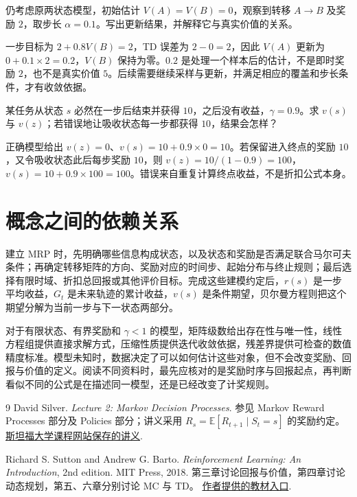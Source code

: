 \documentclass[UTF8,12pt,a4paper,fontset=fandol]{ctexart}
\begin{document}
\begin{example}[一次 TD 更新是否等于求出了价值]
仍考虑原两状态模型，初始估计 $V(A)=V(B)=0$，观察到转移 $A\to B$ 及奖励 $2$，取步长 $\alpha=0.1$。写出更新结果，并解释它与真实价值的关系。
\end{example}
\begin{solve}
一步目标为 $2+0.8V(B)=2$，TD 误差为 $2-0=2$，因此 $V(A)$ 更新为 $0+0.1\times2=0.2$，$V(B)$ 保持为零。$0.2$ 是处理一个样本后的估计，不是即时奖励 $2$，也不是真实价值 $5$。后续需要继续采样与更新，并满足相应的覆盖和步长条件，才有收敛依据。
\end{solve}

\begin{example}[终止奖励与吸收状态奖励的区别]
某任务从状态 $s$ 必然在一步后结束并获得 $10$，之后没有收益，$\gamma=0.9$。求 $v(s)$ 与 $v(z)$；若错误地让吸收状态每一步都获得 $10$，结果会怎样？
\end{example}
\begin{solve}
正确模型给出 $v(z)=0$、$v(s)=10+0.9\times0=10$。若保留进入终点的奖励 $10$，又令吸收状态此后每步奖励 $10$，则 $v(z)=10/(1-0.9)=100$，$v(s)=10+0.9\times100=100$。错误来自重复计算终点收益，不是折扣公式本身。
\end{solve}

\section{概念之间的依赖关系}
\label{sec:mrp-connections}

建立 MRP 时，先明确哪些信息构成状态，以及状态和奖励是否满足联合马尔可夫条件；再确定转移矩阵的方向、奖励对应的时间步、起始分布与终止规则；最后选择有限时域、折扣总回报或其他评价目标。完成这些建模约定后，$r(s)$ 是一步平均收益，$G_t$ 是未来轨迹的累计收益，$v(s)$ 是条件期望，贝尔曼方程则把这个期望分解为当前一步与下一状态两部分。

对于有限状态、有界奖励和 $\gamma<1$ 的模型，矩阵级数给出存在性与唯一性，线性方程组提供直接求解方式，压缩性质提供迭代收敛依据，残差界提供可检查的数值精度标准。模型未知时，数据决定了可以如何估计这些对象，但不会改变奖励、回报与价值的定义。阅读不同资料时，最先应核对的是奖励时序与回报起点，再判断看似不同的公式是在描述同一模型，还是已经改变了计奖规则。

\begin{thebibliography}{9}
  David Silver.
  \textit{Lecture 2: Markov Decision Processes}.
  参见 Markov Reward Processes 部分及 Policies 部分；讲义采用
  $R_s=\mathbb E[R_{t+1}\mid S_t=s]$ 的奖励约定。
  \href{https://web.stanford.edu/class/cme241/lecture_slides/david_silver_slides/MDP.pdf}{斯坦福大学课程网站保存的讲义}.

  Richard S. Sutton and Andrew G. Barto.
  \textit{Reinforcement Learning: An Introduction}, 2nd edition.
  MIT Press, 2018.
  第三章讨论回报与价值，第四章讨论动态规划，第五、六章分别讨论 MC 与 TD。
  \href{https://incompleteideas.net/book/the-book-2nd.html}{作者提供的教材入口}.
\end{thebibliography}
\end{document}
